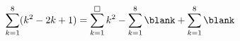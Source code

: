 $\displaystyle\sum_{k=1}^{8}(k^2-2k+1)=\sum_{k=1}^{\text{\setlength{\fboxsep}{0.8pt}\framebox[5.6pt]{\rule{0pt}{3.2pt}}}}k^2-\sum_{k=1}^{8}\blank+\sum_{k=1}^{8}\blank$
